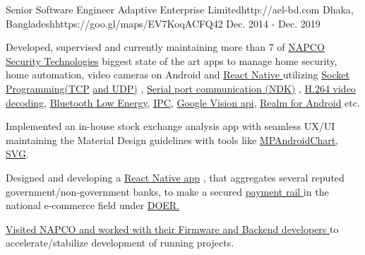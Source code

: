 

\begin{workentries}

\workentry
{Senior Software Engineer} %
{Adaptive Enterprise Limited}{http://ael-bd.com} %
{Dhaka, Bangladesh}{https://goo.gl/maps/EV7KoqACFQ42} %
{Dec. 2014 - Dec. 2019} %
{
  \begin{workitems} %
    \item {Developed, supervised and currently maintaining more than 7 of
    {\href{http://www.napcosecurity.com}{NAPCO Security Technologies}}
    biggest state of the art apps to manage home security, home automation, video cameras on Android and 
    {\href{https://facebook.github.io/react-native/}{React Native }}
    utilizing 
    {\href{https://www.geeksforgeeks.org/socket-programming-in-java/}{Socket Programming(TCP}}
    {\href{https://www.geeksforgeeks.org/working-udp-datagramsockets-java/}{and UDP)}}
    , 
    {\href{https://github.com/cepr/android-serialport-api/tree/master/android-serialport-api/project}{Serial port communication (NDK)}}
    , 
    {\href{https://ieeexplore.ieee.org/document/1410457}{H.264 video decoding}}, 
    {\href{https://en.wikipedia.org/wiki/Bluetooth_Low_Energy}{Bluetooth Low Energy}}, 
    {\href{https://developer.android.com/guide/components/aidl}{IPC}}, 
    {\href{https://developers.google.com/vision/}{Google Vision api}}, 
    {\href{https://realm.io}{Realm for Android}}
    etc.}
    \item {Implemented an in-house stock exchange analysis app with seamless UX/UI maintaining the Material Design guidelines with tools like
    {\href{https://github.com/PhilJay/MPAndroidChart}{MPAndroidChart}},
    {\href{https://www.sitepoint.com/svg-101-what-is-svg/}{SVG}.}
    }
    \item {Designed and developing a 
    {\href{https://facebook.github.io/react-native/}{React Native app}}
    , that aggregates several reputed government/non-government banks, to make a secured 
    {\href{https://www.paymentrails.com}{payment rail }}
    in the national 
    e-commerce field under 
    {\href{http://doer.com.bd}{DOER.}}
    }
    \item {\href{https://drive.google.com/open?id=1j3ffYnrOgq29SupVo5lvn_BiN_UI0ly_}{Visited NAPCO and worked with their Firmware and Backend developers }
    to accelerate/stabilize development of running projects.}
  \end{workitems}
}


\end{workentries}
